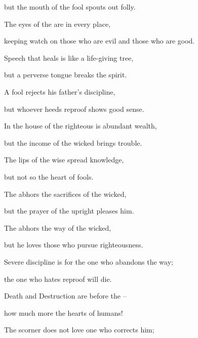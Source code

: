 {\par }{\Q but the mouth
of the fool
spouts
out folly.
\par }{\Q {}The eyes
of the {}
are in every
place,
\par }{\Q keeping watch
on those who are evil
and those who are good.
\par }{\Q {}Speech that heals
is like a life-giving
tree,
\par }{\Q but a perverse
tongue
breaks
the spirit.
\par }{\Q {}A fool
rejects
his father’s
discipline,
\par }{\Q but whoever heeds
reproof
shows good sense.
\par }{\Q {}In the house
of the righteous
is abundant
wealth,
\par }{\Q but
the income
of the wicked
brings trouble.
\par }{\Q {}The lips
of the wise
spread
knowledge,
\par }{\Q but not
so
the heart
of fools.
\par }{\Q {}The
{}
abhors
the sacrifices
of the wicked,
\par }{\Q but the prayer
of the upright
pleases him.
\par }{\Q {}The
{}
abhors
the way
of the wicked,
\par }{\Q but he loves
those who pursue
righteousness.
\par }{\Q {}Severe discipline
is for the one who abandons
the way;
\par }{\Q the one who hates
reproof
will die.
\par }{\Q {}Death
and Destruction
are before
the
{} –
\par }{\Q how
much
more the hearts
of humans!
\par }{\Q {}The scorner
does not
love
one who corrects
him;

}
